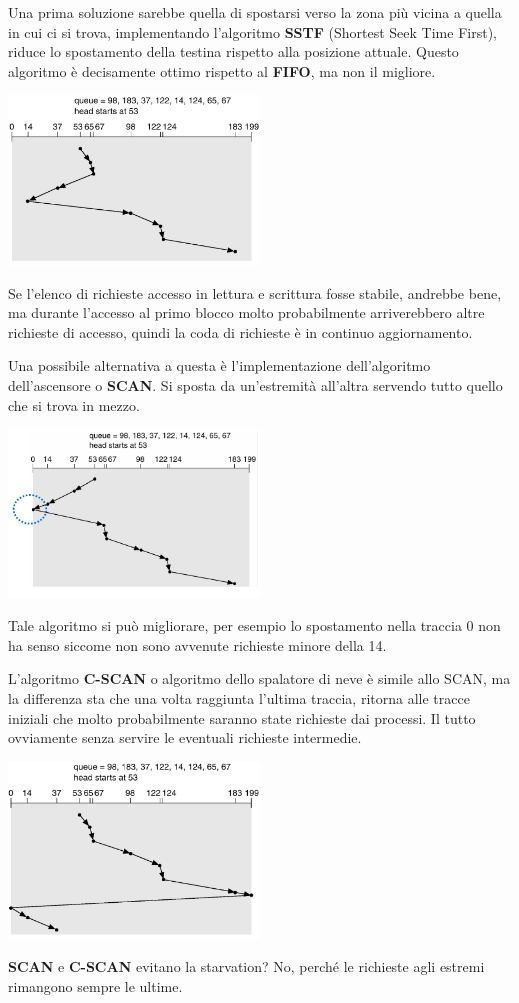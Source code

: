 \documentclass[a4paper, 12pt]{book}
\begin{document}
Una prima soluzione sarebbe quella di spostarsi verso la 
zona più vicina a quella in cui ci si trova, implementando 
l'algoritmo \textbf{SSTF} (Shortest Seek Time First), riduce 
lo spostamento della testina rispetto alla posizione attuale.
Questo algoritmo è decisamente ottimo rispetto al \textbf{FIFO}, 
ma non il migliore.
\begin{center}
    \includegraphics[width=0.5\textwidth]{sstf.png}
\end{center}
Se l'elenco di richieste accesso in lettura e scrittura fosse 
stabile, andrebbe bene, ma durante l'accesso al primo blocco
molto probabilmente arriverebbero altre richieste di accesso, 
quindi la coda di richieste è in continuo aggiornamento.

Una possibile alternativa a questa è l'implementazione 
dell'algoritmo dell'ascensore o \textbf{SCAN}. Si sposta 
da un'estremità all'altra servendo tutto quello che si trova 
in mezzo.
\begin{center}
    \includegraphics[width=0.5\textwidth]{scan.png}
\end{center}
Tale algoritmo si può migliorare, per esempio lo spostamento
nella traccia 0 non ha senso siccome non sono avvenute richieste 
minore della 14.

L'algoritmo \textbf{C-SCAN} o algoritmo dello spalatore 
di neve è simile allo SCAN, ma la differenza sta che una
volta raggiunta l'ultima traccia, ritorna alle tracce iniziali 
che molto probabilmente saranno state richieste dai processi.
Il tutto ovviamente senza servire le eventuali richieste 
intermedie.
\begin{center}
    \includegraphics[width=0.5\textwidth]{c-scan.png}
\end{center}
\textbf{SCAN} e \textbf{C-SCAN} evitano la starvation?
No, perché le richieste agli estremi rimangono sempre le 
ultime.
\end{document}
